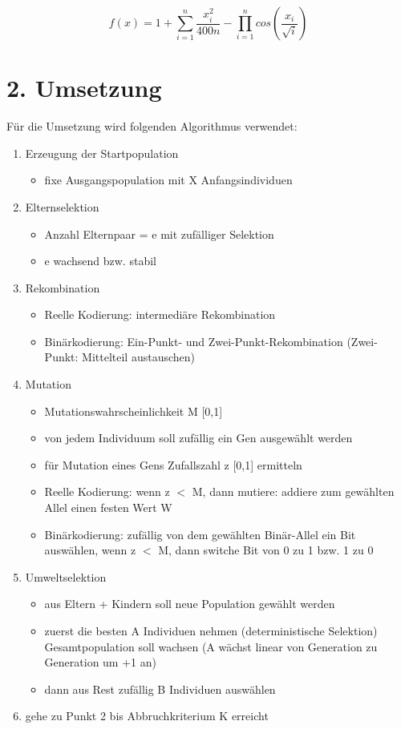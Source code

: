 \documentclass[12pt,
    a4paper,
    headinclude,
    footinclude]{scrreprt}
\begin{document}
\[f(x) = 1 +  \sum_{i=1}^n \frac{x_i^{2}}{400n} -  \prod \limits_{i=1}^n cos \left(\frac{x_i}{\sqrt{i}}\right)\]


\section*{2. Umsetzung}


Für die Umsetzung wird folgenden Algorithmus verwendet:

\begin{enumerate}
	\item Erzeugung der Startpopulation 
	\begin{itemize}
		\item fixe Ausgangspopulation mit X Anfangsindividuen
	\end{itemize}
	\item Elternselektion
		\begin{itemize}
		\item Anzahl Elternpaar = e mit zufälliger Selektion
		\item e wachsend bzw. stabil
	\end{itemize}
	\item Rekombination
		\begin{itemize}
		\item Reelle Kodierung: intermediäre Rekombination
		\item Binärkodierung: Ein-Punkt- und Zwei-Punkt-Rekombination (Zwei-Punkt: Mittelteil austauschen)
	\end{itemize}
	\item Mutation
		\begin{itemize}
		\item Mutationswahrscheinlichkeit M [0,1]
		\item von jedem Individuum soll zufällig ein Gen ausgewählt werden
		\item für Mutation eines Gens Zufallszahl z [0,1] ermitteln
		\item Reelle Kodierung: wenn z $<$ M, dann mutiere: addiere zum gewählten Allel einen festen Wert W
		\item Binärkodierung: zufällig von dem gewählten Binär-Allel ein Bit auswählen, wenn z $<$ M, dann switche Bit von 0 zu 1 bzw. 1 zu 0
	\end{itemize} 
	\item Umweltselektion
		\begin{itemize}
		\item aus Eltern + Kindern soll neue Population gewählt werden 
		\item zuerst die besten A Individuen nehmen (deterministische Selektion) Gesamtpopulation soll wachsen (A wächst linear von Generation zu Generation um +1 an)
		\item dann aus Rest zufällig B Individuen auswählen
	\end{itemize}
	\item gehe zu Punkt 2 bis Abbruchkriterium K erreicht
\end{enumerate}
\end{document}
